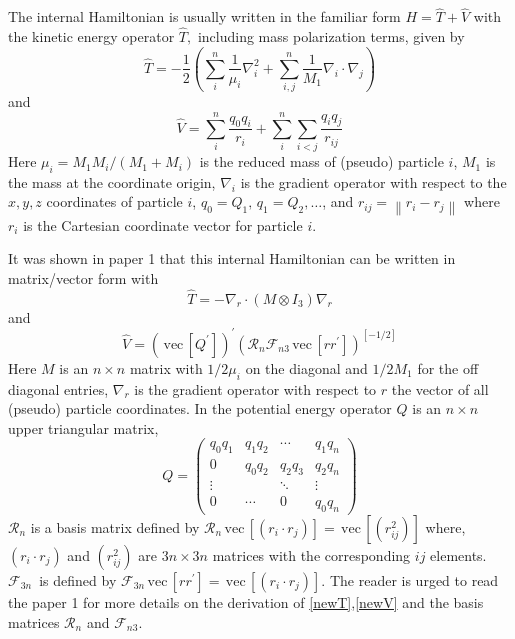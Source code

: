 \documentclass[12pt,thmsa,suthesis,verbatim]{report}
\begin{document}
The internal Hamiltonian is usually written in the familiar form $H=\hat{T}+%
\hat{V}$ with the kinetic energy operator $\hat{T},$ including mass
polarization terms, given by 
\begin{equation}
\hat{T}=-\frac 12\left( \sum_i^n\frac 1{\mu _i}\nabla _i^2+\sum_{i,j}^n\frac
1{M_1}\nabla _i\cdot \nabla _j\right)  \label{oldT}
\end{equation}
and 
\begin{equation}
\hat{V}=\sum_i^n\frac{q_0q_i}{r_i}+\sum_i^n\sum_{i<j}\frac{q_iq_j}{r_{ij}}
\label{oldV}
\end{equation}
Here $\mu _i=M_1M_i/\left( M_1+M_i\right) $ is the reduced mass of (pseudo)
particle $i$, $M_1$ is the mass at the coordinate origin, $\nabla _i$ is the
gradient operator with respect to the $x,y,z$ coordinates of particle $i$, $%
q_0=Q_1,\,q_1=Q_2,\ldots $, and $r_{ij}=\left\| r_i-r_j\right\| $ where $r_i$
is the Cartesian coordinate vector for particle $i$.

It was shown in paper 1 that this internal Hamiltonian can be written in
matrix/vector form with 
\begin{equation}
\hat{T}=-\nabla _r\cdot \left( M\otimes I_3\right) \nabla _r  \label{newT}
\end{equation}
and 
\begin{equation}
\hat{V}=\left( \,\mathrm{vec}\,\left[ Q^{\prime }\right] \right) ^{\prime
}\left( \mathcal{R}_n\mathcal{F}_{n3}\,\mathrm{vec}\,\left[ rr^{\prime
}\right] \right) ^{\left[ -1/2\right] }  \label{newV}
\end{equation}
Here $M$ is an $n\times n$ matrix with $1/2\mu _i$ on the diagonal and $%
1/2M_1$ for the off diagonal entries, $\nabla _r$ is the gradient operator
with respect to $r$ the vector of all (pseudo) particle coordinates. In the
potential energy operator $Q$ is an $n\times n$ upper triangular matrix, 
\begin{equation}
Q=\left( 
\begin{array}{cccc}
q_0q_1 & q_1q_2 & \cdots & q_1q_n \\ 
0 & q_0q_2 & q_2q_3 & q_2q_n \\ 
\vdots &  & \ddots & \vdots \\ 
0 & \cdots & 0 & q_0q_n
\end{array}
\right)
\end{equation}
$\mathcal{R}_n$ is a basis matrix defined by $\mathcal{R}_n\,\mathrm{vec}%
\,\left[ \left( r_i\cdot r_j\right) \right] =\,\mathrm{vec}\,\left[ \left(
r_{ij}^2\right) \right] $ where, $\left( r_i\cdot r_j\right) $ and $\left(
r_{ij}^2\right) $ are $3n\times 3n$ matrices with the corresponding $ij$
elements. $\mathcal{F}_{3n}\,$ is defined by $\mathcal{F}_{3n}\,\mathrm{vec}%
\,\left[ rr^{\prime }\right] =\,\mathrm{vec}\,\left[ \left( r_i\cdot
r_j\right) \right] $. The reader is urged to read the paper 1 for more
details on the derivation of \ref{newT},\ref{newV} and the basis matrices $%
\mathcal{R}_n$ and $\mathcal{F}_{n3}$.
\end{document}
